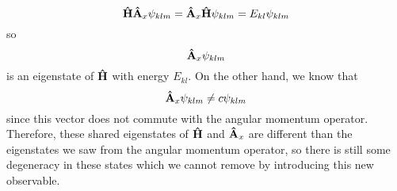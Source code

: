 \documentclass[a4paper,twoside,master.tex]{subfiles}
\begin{document}
\begin{equation}
    \vu{H} \vu{A}_x \psi_{klm} = \vu{A}_x \vu{H} \psi_{klm} = E_{kl} \psi_{klm}
\end{equation}
so
\begin{equation}
    \vu{A}_x \psi_{klm}
\end{equation}
is an eigenstate of $ \vu{H} $ with energy $ E_{kl} $. On the other hand, we know that
\begin{equation}
    \vu{A}_x \psi_{klm} \neq c \psi_{klm}
\end{equation}
since this vector does not commute with the angular momentum operator. Therefore, these shared eigenstates of $ \vu{H} $ and $ \vu{A}_x $ are different than the eigenstates we saw from the angular momentum operator, so there is still some degeneracy in these states which we cannot remove by introducing this new observable.


 
\end{document}
